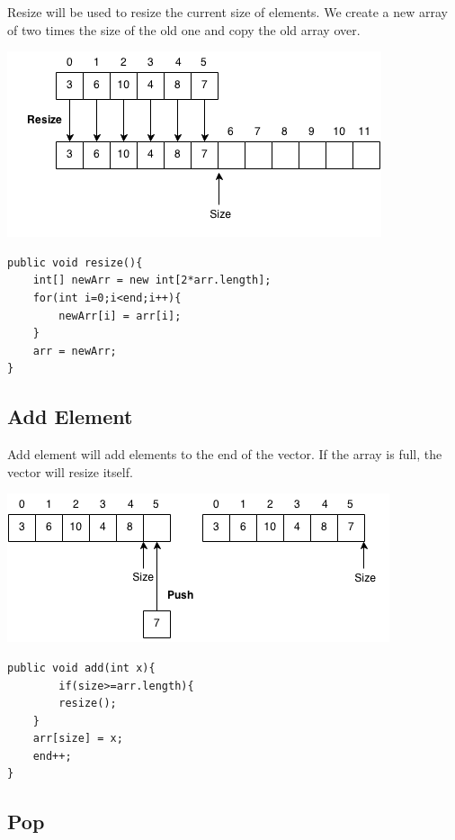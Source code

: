 \documentclass[11pt,oneside]{book}
\makeatletter
\def\maxwidth#1{\ifdim\Gin@nat@width>#1 #1\else\Gin@nat@width\fi}
\makeatother
\begin{document}
Resize will be used to resize the current size of elements. We create a new array of two times the size of the old one and copy the old array over.

\vspace{5px}\includegraphics[width=\maxwidth{\textwidth}]{vector3.png}

\begin{lstlisting}
public void resize(){
    int[] newArr = new int[2*arr.length];
    for(int i=0;i<end;i++){
        newArr[i] = arr[i];
    }
    arr = newArr;
}
\end{lstlisting}

\subsection{Add Element}

Add element will add elements to the end of the vector. If the array is full, the vector will resize itself.

\vspace{5px}\includegraphics[width=\maxwidth{\textwidth}]{vector2.png}

\begin{lstlisting}
public void add(int x){
        if(size>=arr.length){
        resize();
    }
    arr[size] = x;
    end++;
}
\end{lstlisting}

\subsection{Pop}
\end{document}
